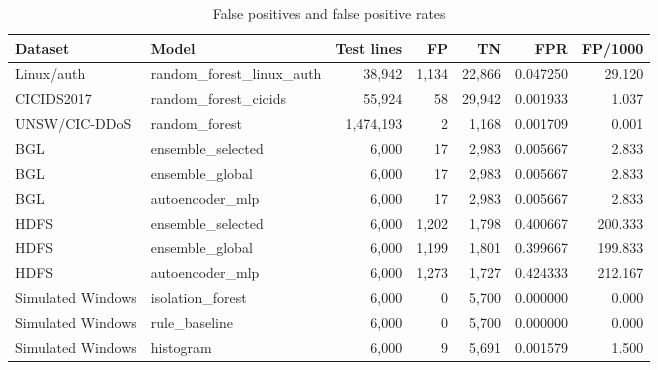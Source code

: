 \begin{table}[t]
\caption{False positives and false positive rates}
\label{tab:false_positives_full}
\centering
\scriptsize
\begin{tabular}{l l r r r r r}
\toprule
\textbf{Dataset} & \textbf{Model} & \textbf{Test lines} & \textbf{FP} & \textbf{TN} & \textbf{FPR} & \textbf{FP/1000} \\
\midrule
Linux/auth & random\_forest\_linux\_auth & 38,942 & 1,134 & 22,866 & 0.047250 & 29.120 \\
CICIDS2017 & random\_forest\_cicids & 55,924 & 58 & 29,942 & 0.001933 & 1.037 \\
UNSW/CIC-DDoS & random\_forest & 1,474,193 & 2 & 1,168 & 0.001709 & 0.001 \\
BGL & ensemble\_selected & 6,000 & 17 & 2,983 & 0.005667 & 2.833 \\
BGL & ensemble\_global & 6,000 & 17 & 2,983 & 0.005667 & 2.833 \\
BGL & autoencoder\_mlp & 6,000 & 17 & 2,983 & 0.005667 & 2.833 \\
HDFS & ensemble\_selected & 6,000 & 1,202 & 1,798 & 0.400667 & 200.333 \\
HDFS & ensemble\_global & 6,000 & 1,199 & 1,801 & 0.399667 & 199.833 \\
HDFS & autoencoder\_mlp & 6,000 & 1,273 & 1,727 & 0.424333 & 212.167 \\
Simulated Windows & isolation\_forest & 6,000 & 0 & 5,700 & 0.000000 & 0.000 \\
Simulated Windows & rule\_baseline & 6,000 & 0 & 5,700 & 0.000000 & 0.000 \\
Simulated Windows & histogram & 6,000 & 9 & 5,691 & 0.001579 & 1.500 \\
\bottomrule
\end{tabular}
\end{table}
